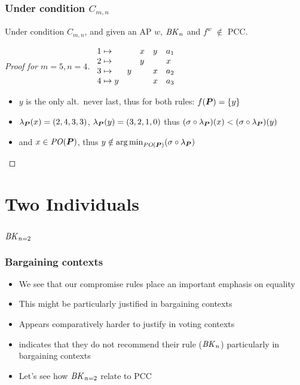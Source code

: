 \documentclass[french, english]{beamer}
\begin{document}
\begin{frame}
	\frametitle{Under condition \texorpdfstring{$C_{m, n}$}{C(m, n)}}
	\begin{theorem}
		Under condition $C_{m, n}$, and  given an AP $w$, $\BK[n]$ and $f^w$ $\notin$ PCC.
	\end{theorem}
	\begin{proof}[Proof for $m = 5, n = 4$]
		$\begin{array}{r@{\hspace{1mm} \mapsto \hspace{1mm}}lllll}
			1 &	&	&x	&y	&a_1\\%
			2 &	&	&y	&	&x\\%
			3 &	&y	&	&x	&a_2\\%
			4 &y	&	&	&x	&a_3\\%
		\end{array}$%
		\begin{itemize}
			\item $y$ is the only alt.\ never last, thus for both rules: $f(\boldsymbol{P}) = \{y\}$
			\item $\lambda_{\bm{P}}(x) = (2, 4, 3, 3)$, $\lambda_{\bm{P}}(y) = (3, 2, 1, 0)$ thus $(\sigma \circ \lambda_{\bm{P}})(x) < (\sigma \circ \lambda_{\bm{P}})(y)$
			\item and $x \in \mathit{PO}(\boldsymbol{P})$, thus $y \notin \operatorname*{arg\,min}_{\mathit{PO}(\boldsymbol{P})}(\sigma \circ \lambda_{\bm{P}})$ \qedhere
		\end{itemize}
	\end{proof}
\end{frame}

\section{Two Individuals}
\subsection{\texorpdfstring{$\BK[n = 2]$}{BK for two individuals}}
\begin{frame}
	\frametitle{Bargaining contexts}
	\begin{itemize}
		\item We see that our compromise rules place an important emphasis on equality
		\item This might be particularly justified in bargaining contexts
		\item Appears comparatively harder to justify in voting contexts
		\item \citet{Brams2001} indicates that they do not recommend their rule ($\BK[n]$) particularly in bargaining contexts
		\item Let’s see how $\BK[n = 2]$ relate to PCC
	\end{itemize}
\end{frame}
\end{document}
